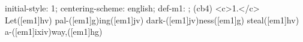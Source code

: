 initial-style: 1;
centering-scheme: english;
def-m1: \grealign;
(cb4) <c>1.</c> Let([em1]hv) pal-([em1]g)ing([em1]jv) dark-([em1]jv)ness([em1]g) steal([em1]hv) a-([em1]ixiv)way,([em1]hg)
